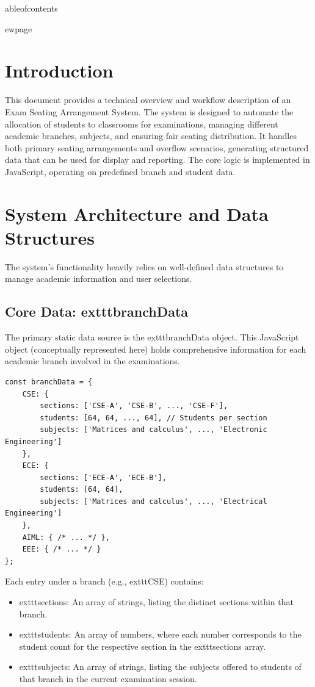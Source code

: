 \documentclass{article}
\author{Gemini CLI}
\date{	oday}
\begin{document}
\maketitle
	ableofcontents

ewpage

\section{Introduction}
This document provides a technical overview and workflow description of an Exam Seating Arrangement System. The system is designed to automate the allocation of students to classrooms for examinations, managing different academic branches, subjects, and ensuring fair seating distribution. It handles both primary seating arrangements and overflow scenarios, generating structured data that can be used for display and reporting. The core logic is implemented in JavaScript, operating on predefined branch and student data.

\section{System Architecture and Data Structures}
The system's functionality heavily relies on well-defined data structures to manage academic information and user selections.

\subsection{Core Data: 	exttt{branchData}}
The primary static data source is the 	exttt{branchData} object. This JavaScript object (conceptually represented here) holds comprehensive information for each academic branch involved in the examinations.
\begin{verbatim}
const branchData = {
    CSE: {
        sections: ['CSE-A', 'CSE-B', ..., 'CSE-F'],
        students: [64, 64, ..., 64], // Students per section
        subjects: ['Matrices and calculus', ..., 'Electronic Engineering']
    },
    ECE: {
        sections: ['ECE-A', 'ECE-B'],
        students: [64, 64],
        subjects: ['Matrices and calculus', ..., 'Electrical Engineering']
    },
    AIML: { /* ... */ },
    EEE: { /* ... */ }
};
\end{verbatim}
Each entry under a branch (e.g., 	exttt{CSE}) contains:
\begin{itemize}
    \item 	exttt{sections}: An array of strings, listing the distinct sections within that branch.
    \item 	exttt{students}: An array of numbers, where each number corresponds to the student count for the respective section in the 	exttt{sections} array.
    \item 	exttt{subjects}: An array of strings, listing the subjects offered to students of that branch in the current examination session.
\end{itemize}
\end{document}
